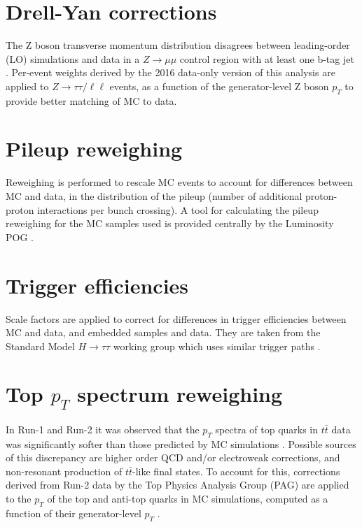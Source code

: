 \section{Drell-Yan corrections}
The Z boson transverse momentum distribution disagrees between leading-order (LO) simulations and data in a $Z \rightarrow \mu\mu$ control region with at least one b-tag jet \cite{CMS-HIG-17-024}. Per-event weights derived by the 2016 data-only version of this analysis \cite{CMS-HIG-17-024} are applied to $Z \rightarrow \tau\tau / \ell \ell$ events, as a function of the generator-level Z boson $p_{T}$ to provide better matching of MC to data.

\section{Pileup reweighing}
Reweighing is performed to rescale MC events to account for differences between MC and data, in the distribution of the pileup (number of additional proton-proton interactions per bunch crossing). A tool for calculating the pileup reweighing for the MC samples used is provided centrally by the Luminosity POG \cite{twiki_LUMI_POG_recommendation}.

\section{Trigger efficiencies}
Scale factors are applied to correct for differences in trigger efficiencies between MC and data, and embedded samples and data. They are taken from the Standard Model $H \rightarrow \tau\tau$ working group which uses similar trigger paths \cite{twiki_HiggsToTauTauWorkingLegacyRun2}.

\section{Top $p_{T}$ spectrum reweighing}
In Run-1 and Run-2 it was observed that the $p_{T}$ spectra of top quarks in $t\bar{t}$ data was significantly softer than those predicted by MC simulations \cite{twiki_Top_pt_reweighing}. Possible sources of this discrepancy are higher order QCD and/or electroweak corrections, and non-resonant production of $t\bar{t}$-like final states. To account for this, corrections derived from Run-2 data by the Top Physics Analysis Group (PAG) are applied to the $p_{T}$ of the top and anti-top quarks in MC simulations, computed as a function of their generator-level $p_{T}$ \cite{twiki_Top_pt_reweighing}.

